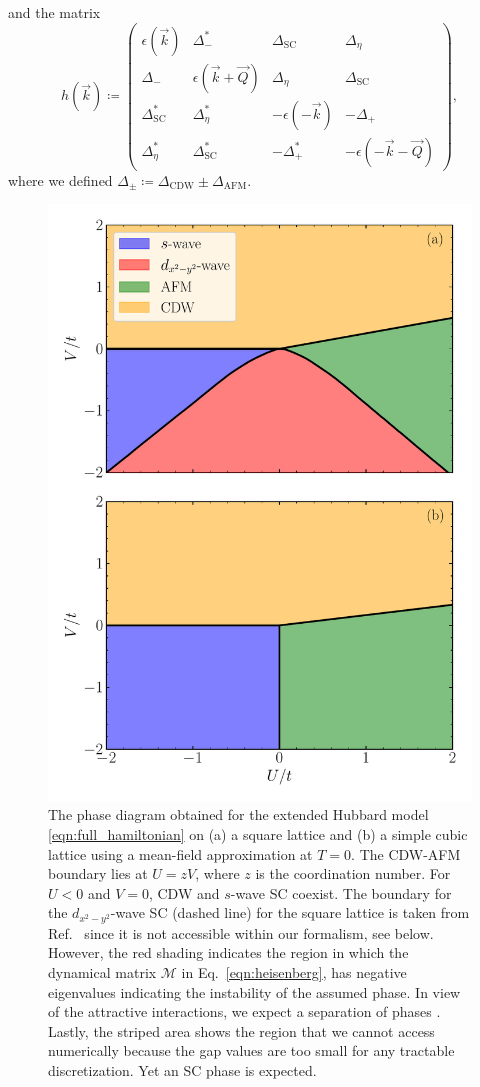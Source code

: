 \documentclass[
    reprint, 
    aps,
    preprintnumbers,
    twocolumn,
    prb,
    superscriptaddress
]{revtex4-2}
\newcommand{\vk}{\vec{k}}
\newcommand{\vQ}{\vec{Q}}
\newcommand{\mM}{\mathcal{M}}
\begin{document}
and the matrix
\begin{equation}
    h(\vk) \coloneqq  \begin{pmatrix}
        \epsilon (\vk) & \Delta_-^* & \Delta_\text{SC} & \Delta_\eta \\
        \Delta_- & \epsilon (\vk + \vQ) & \Delta_\eta & \Delta_\text{SC} \\
        \Delta_\text{SC}^* & \Delta_\eta^* & - \epsilon (-\vk) & - \Delta_+ \\
        \Delta_\eta^* & \Delta_\text{SC}^* & - \Delta_+^* & - \epsilon (-\vk - \vQ)
        \end{pmatrix},
\end{equation}
where we defined $\Delta_\pm \coloneqq \Delta_\text{CDW} \pm \Delta_\text{AFM}$.

\begin{figure}
    \centering
    \includegraphics[width=.48\textwidth]{plots/phase_diagram.pdf}
    \caption{The phase diagram obtained for the extended Hubbard model \eqref{eqn:full_hamiltonian} on 
    (a) a square lattice and (b) a simple cubic lattice using a mean-field approximation at $T=0$.
    The CDW-AFM boundary lies at $U = zV$, where $z$ is the coordination number. 
    For $U<0$ and $V=0$,  CDW and $s$-wave SC coexist.
    The boundary for the $d_{x^2 - y^2}$-wave SC (dashed line) for the square lattice is  taken from Ref.\
		\cite{Micnas88b} since it is not accessible within our formalism, see below.
    However, the red shading indicates the region in which the dynamical matrix $\mM$ in 
		Eq.\ \eqref{eqn:heisenberg}, has negative eigenvalues indicating the instability of the assumed phase.
    In view of the attractive interactions, we expect a separation of phases \cite{Linner23}.
    Lastly, the striped area shows the region that we cannot access numerically
		because the gap values are too small for any tractable discretization. 
    Yet an SC phase is expected.}
    \label{fig:phase_diagram}
\end{figure}
\end{document}
